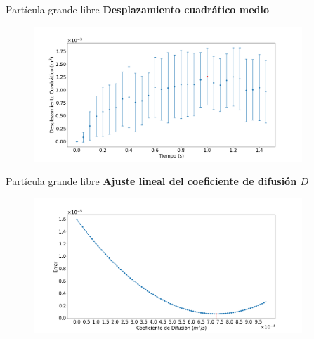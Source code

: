 \begin{frame}{Partícula grande libre}
    \textbf{Desplazamiento cuadrático medio}
    \begin{minipage}[c]{0.8\linewidth}
        \begin{figure}[H]
            \centering
            \includegraphics[width=0.9\textwidth]{pic/05-results/dcm_graph}
            \label{fig:dcm-graph}
        \end{figure}
    \end{minipage}
    \begin{minipage}[c]{0.15\linewidth}
    \end{minipage}
\end{frame}

\begin{frame}{Partícula grande libre}
    \textbf{Ajuste lineal del coeficiente de difusión $D$}
    \begin{minipage}[c]{0.8\linewidth}
        \begin{figure}[H]
            \centering
            \includegraphics[width=0.9\textwidth]{pic/05-results/dcm_slope}
            \label{fig:dcm-slope}
        \end{figure}
    \end{minipage}
    \begin{minipage}[c]{0.15\linewidth}
    \end{minipage}
\end{frame}

